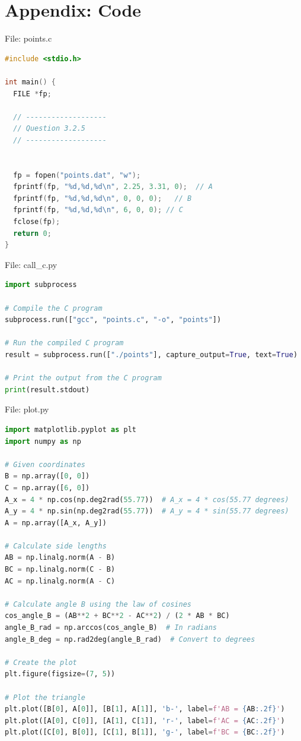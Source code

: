 \documentclass{beamer}
\numberwithin{equation}{section}
\theoremstyle{remark}
\begin{document}
\section*{Appendix: Code}

\begin{frame}[fragile]{File: points.c}
\begin{lstlisting}[language=C]
#include <stdio.h>

int main() {
  FILE *fp;

  // -------------------
  // Question 3.2.5
  // -------------------


  fp = fopen("points.dat", "w");
  fprintf(fp, "%d,%d,%d\n", 2.25, 3.31, 0);  // A
  fprintf(fp, "%d,%d,%d\n", 0, 0, 0);   // B
  fprintf(fp, "%d,%d,%d\n", 6, 0, 0); // C
  fclose(fp);
  return 0;
}
\end{lstlisting}
\end{frame}

\begin{frame}[fragile]{File: call\_c.py}
\begin{lstlisting}[language=Python]
import subprocess

# Compile the C program
subprocess.run(["gcc", "points.c", "-o", "points"])

# Run the compiled C program
result = subprocess.run(["./points"], capture_output=True, text=True)

# Print the output from the C program
print(result.stdout)
\end{lstlisting}
\end{frame}

\begin{frame}[fragile]{File: plot.py}
\begin{lstlisting}[language=Python]
import matplotlib.pyplot as plt
import numpy as np

# Given coordinates
B = np.array([0, 0])
C = np.array([6, 0])
A_x = 4 * np.cos(np.deg2rad(55.77))  # A_x = 4 * cos(55.77 degrees)
A_y = 4 * np.sin(np.deg2rad(55.77))  # A_y = 4 * sin(55.77 degrees)
A = np.array([A_x, A_y])

# Calculate side lengths
AB = np.linalg.norm(A - B)
BC = np.linalg.norm(C - B)
AC = np.linalg.norm(A - C)

# Calculate angle B using the law of cosines
cos_angle_B = (AB**2 + BC**2 - AC**2) / (2 * AB * BC)
angle_B_rad = np.arccos(cos_angle_B)  # In radians
angle_B_deg = np.rad2deg(angle_B_rad)  # Convert to degrees

# Create the plot
plt.figure(figsize=(7, 5))

# Plot the triangle
plt.plot([B[0], A[0]], [B[1], A[1]], 'b-', label=f'AB = {AB:.2f}')
plt.plot([A[0], C[0]], [A[1], C[1]], 'r-', label=f'AC = {AC:.2f}')
plt.plot([C[0], B[0]], [C[1], B[1]], 'g-', label=f'BC = {BC:.2f}')
\end{lstlisting}
\end{frame}
\end{document}
